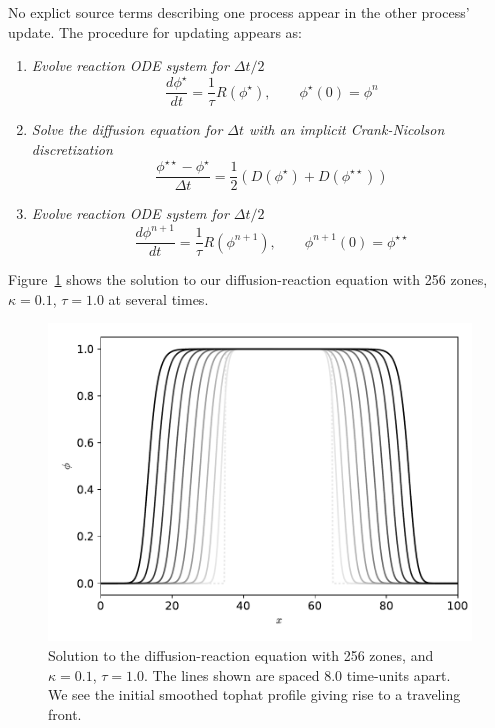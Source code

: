 No explict source terms describing one process appear in the other
process' update.  The procedure for updating appears as:
\begin{enumerate}
\item {\em Evolve reaction ODE system for $\Delta t/2$}
   \begin{equation}
   \frac{d\phi^\star}{dt} = \frac{1}{\tau} R(\phi^\star), \qquad 
   \phi^\star(0) = \phi^n
   \end{equation}

\item {\em Solve the diffusion equation for $\Delta t$ with an
           implicit Crank-Nicolson discretization}
   \begin{equation}
   \frac{\phi^{\star\star} - \phi^\star}{\Delta t} =
      \frac{1}{2} (D(\phi^\star) + D(\phi^{\star\star}))
   \end{equation}

\item {\em Evolve reaction ODE system for $\Delta t/2$}
   \begin{equation}
   \frac{d\phi^{n+1}}{dt} = \frac{1}{\tau} R(\phi^{n+1}), \qquad 
   \phi^{n+1}(0) = \phi^{\star\star}
   \end{equation}

\end{enumerate}

Figure~\ref{fig:diffreact} shows the solution to our diffusion-reaction
equation with 256 zones, $\kappa = 0.1$, $\tau = 1.0$ at several times.

\begin{figure}[t]
\centering
\includegraphics[width=5.0in]{flame_seq}
\caption[Solution to the diffusion-reaction equation]
  {\label{fig:diffreact} Solution to the diffusion-reaction equation
   with 256 zones, and $\kappa = 0.1$, $\tau = 1.0$.  The lines shown
   are spaced 8.0 time-units apart.  We see the initial smoothed tophat
   profile giving rise to a traveling front.}
\end{figure}


